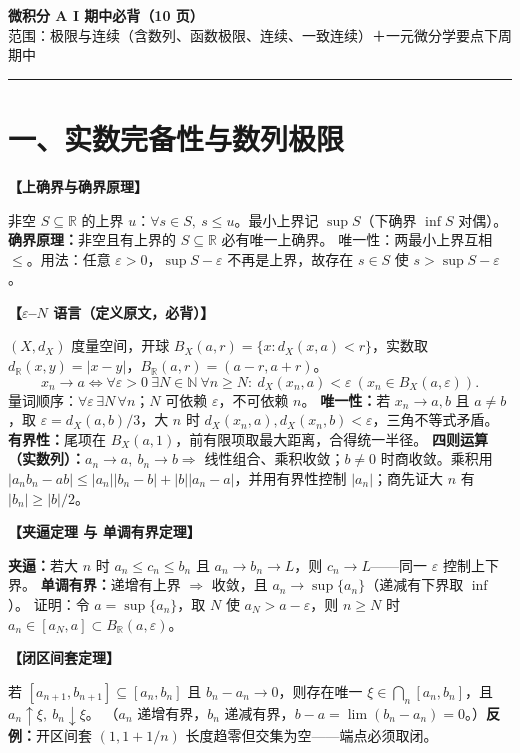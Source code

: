 \documentclass[12pt,a4paper,UTF8]{ctexart}
\newcommand{\R}{\mathbb R}
\newcommand{\eps}{\varepsilon}
\newenvironment{kp}[1]{\par\smallskip\noindent\textbf{【#1】}\par\nobreak\smallskip}{\par\smallskip}
\begin{document}
\begin{center}
{\Large\bfseries 微积分 A I 期中必背（10 页）}\\[2pt]
{\small 范围：极限与连续（含数列、函数极限、连续、一致连续）＋一元微分学要点\quad 下周期中}
\end{center}
\vspace{-4pt}
\hrule
\vspace{4pt}

\section*{一、实数完备性与数列极限}

\begin{kp}{上确界与确界原理}
非空 $S\subseteq\R$ 的上界 $u$：$\forall s\in S,\ s\le u$。最小上界记 $\sup S$（下确界 $\inf S$ 对偶）。
\textbf{确界原理：}非空且有上界的 $S\subseteq\R$ 必有唯一上确界。
唯一性：两最小上界互相 $\le$。用法：任意 $\eps>0$，$\sup S-\eps$ 不再是上界，故存在 $s\in S$ 使 $s>\sup S-\eps$。
\end{kp}

\begin{kp}{$\eps$–$N$ 语言（定义原文，必背）}
$(X,d_X)$ 度量空间，开球 $B_X(a,r)=\{x:d_X(x,a)<r\}$，实数取 $d_{\R}(x,y)=|x-y|$，$B_\R(a,r)=(a-r,a+r)$。
\[
x_n\to a\iff \forall\eps>0\ \exists N\in\mathbb N\ \forall n\ge N:\ d_X(x_n,a)<\eps\ (x_n\in B_X(a,\eps)).
\]
量词顺序：$\forall\eps\,\exists N\,\forall n$；$N$ 可依赖 $\eps$，不可依赖 $n$。
\textbf{唯一性：}若 $x_n\to a,b$ 且 $a\ne b$，取 $\eps=d_X(a,b)/3$，大 $n$ 时 $d_X(x_n,a),d_X(x_n,b)<\eps$，三角不等式矛盾。
\textbf{有界性：}尾项在 $B_X(a,1)$，前有限项取最大距离，合得统一半径。
\textbf{四则运算（实数列）：}$a_n\to a,\ b_n\to b\Rightarrow$ 线性组合、乘积收敛；$b\ne0$ 时商收敛。乘积用
$|a_nb_n-ab|\le|a_n||b_n-b|+|b||a_n-a|$，并用有界性控制 $|a_n|$；商先证大 $n$ 有 $|b_n|\ge|b|/2$。
\end{kp}

\begin{kp}{夹逼定理 与 单调有界定理}
\textbf{夹逼：}若大 $n$ 时 $a_n\le c_n\le b_n$ 且 $a_n\to b_n\to L$，则 $c_n\to L$——同一 $\eps$ 控制上下界。
\textbf{单调有界：}递增有上界 $\Rightarrow$ 收敛，且 $a_n\to\sup\{a_n\}$（递减有下界取 $\inf$）。
证明：令 $a=\sup\{a_n\}$，取 $N$ 使 $a_N>a-\eps$，则 $n\ge N$ 时 $a_n\in[a_N,a]\subset B_\R(a,\eps)$。
\end{kp}

\begin{kp}{闭区间套定理}
若 $[a_{n+1},b_{n+1}]\subseteq[a_n,b_n]$ 且 $b_n-a_n\to0$，则存在唯一 $\xi\in\bigcap_n[a_n,b_n]$，且 $a_n\uparrow\xi,\ b_n\downarrow\xi$。
（$a_n$ 递增有界，$b_n$ 递减有界，$b-a=\lim(b_n-a_n)=0$。）\textbf{反例：}开区间套 $(1,1+1/n)$ 长度趋零但交集为空——端点必须取闭。
\end{kp}
\end{document}
